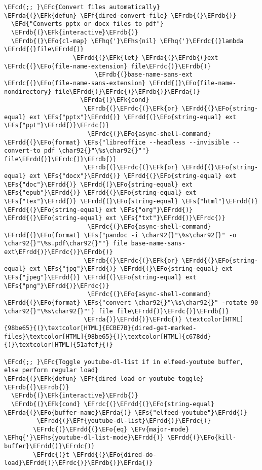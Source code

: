 \documentclass[a4wide,10pt]{article}
\newcommand{\EFc}[1]{\textcolor{EFc}{#1}} %
\newcommand{\EFcd}[1]{\textcolor{EFcd}{#1}} %
\newcommand{\EFs}[1]{\textcolor{EFs}{#1}} %
\newcommand{\EFd}[1]{\textcolor{EFd}{#1}} %
\newcommand{\EFk}[1]{\textcolor{EFk}{#1}} %
\newcommand{\EFf}[1]{\textcolor{EFf}{#1}} %
\newcommand{\EFv}[1]{\textcolor{EFv}{#1}} %
\newcommand{\EFo}[1]{\textcolor{EFo}{#1}} %
\newcommand{\EFhq}[1]{\textcolor{EFhq}{#1}} %
\newcommand{\EFhs}[1]{\textcolor{EFhs}{#1}} %
\newcommand{\EFrda}[1]{\textcolor{EFrda}{#1}} %
\newcommand{\EFrdb}[1]{\textcolor{EFrdb}{#1}} %
\newcommand{\EFrdc}[1]{\textcolor{EFrdc}{#1}} %
\newcommand{\EFrdd}[1]{\textcolor{EFrdd}{#1}} %
\begin{document}
\begin{Code}
\begin{Verbatim}
\EFcd{;; }\EFc{Convert files automatically}
\EFrda{(}\EFk{defun} \EFf{dired-convert-file} \EFrdb{(}\EFrdb{)}
  \EFd{"Converts pptx or docx files to pdf"}
  \EFrdb{(}\EFk{interactive}\EFrdb{)}
  \EFrdb{(}\EFo{cl-map} \EFhq{'}\EFhs{nil} \EFhq{'}\EFrdc{(}lambda \EFrdd{(}file\EFrdd{)}
                   \EFrdd{(}\EFk{let} \EFrda{(}\EFrdb{(}ext \EFrdc{(}\EFo{file-name-extension} file\EFrdc{)}\EFrdb{)}
                         \EFrdb{(}base-name-sans-ext \EFrdc{(}\EFo{file-name-sans-extension} \EFrdd{(}\EFo{file-name-nondirectory} file\EFrdd{)}\EFrdc{)}\EFrdb{)}\EFrda{)}
                     \EFrda{(}\EFk{cond}
                      \EFrdb{(}\EFrdc{(}\EFk{or} \EFrdd{(}\EFo{string-equal} ext \EFs{"pptx"}\EFrdd{)} \EFrdd{(}\EFo{string-equal} ext \EFs{"ppt"}\EFrdd{)}\EFrdc{)}
                       \EFrdc{(}\EFo{async-shell-command} \EFrdd{(}\EFo{format} \EFs{"libreoffice --headless --invisible --convert-to pdf \char92{}"\%s\char92{}""} file\EFrdd{)}\EFrdc{)}\EFrdb{)}
                      \EFrdb{(}\EFrdc{(}\EFk{or} \EFrdd{(}\EFo{string-equal} ext \EFs{"docx"}\EFrdd{)} \EFrdd{(}\EFo{string-equal} ext \EFs{"doc"}\EFrdd{)} \EFrdd{(}\EFo{string-equal} ext \EFs{"epub"}\EFrdd{)} \EFrdd{(}\EFo{string-equal} ext \EFs{"tex"}\EFrdd{)} \EFrdd{(}\EFo{string-equal} \EFs{"html"}\EFrdd{)} \EFrdd{(}\EFo{string-equal} ext \EFs{"org"}\EFrdd{)} \EFrdd{(}\EFo{string-equal} ext \EFs{"txt"}\EFrdd{)}\EFrdc{)}
                       \EFrdc{(}\EFo{async-shell-command} \EFrdd{(}\EFo{format} \EFs{"pandoc -i \char92{}"\%s\char92{}" -o \char92{}"\%s.pdf\char92{}""} file base-name-sans-ext\EFrdd{)}\EFrdc{)}\EFrdb{)}
                      \EFrdb{(}\EFrdc{(}\EFk{or} \EFrdd{(}\EFo{string-equal} ext \EFs{"jpg"}\EFrdd{)} \EFrdd{(}\EFo{string-equal} ext \EFs{"jpeg"}\EFrdd{)} \EFrdd{(}\EFo{string-equal} ext \EFs{"png"}\EFrdd{)}\EFrdc{)}
                       \EFrdc{(}\EFo{async-shell-command} \EFrdd{(}\EFo{format} \EFs{"convert \char92{}"\%s\char92{}" -rotate 90 \char92{}"\%s\char92{}""} file file\EFrdd{)}\EFrdc{)}\EFrdb{)}
                      \EFrda{)}\EFrdd{)}\EFrdc{)} \textcolor[HTML]{98be65}{(}\textcolor[HTML]{ECBE7B}{dired-get-marked-files}\textcolor[HTML]{98be65}{)}\textcolor[HTML]{c678dd}{)}\textcolor[HTML]{51afef}{)}

\EFcd{;; }\EFc{Toggle youtube-dl-list if in elfeed-youtube buffer, else perform regular load}
\EFrda{(}\EFk{defun} \EFf{dired-load-or-youtube-toggle} \EFrdb{(}\EFrdb{)}
  \EFrdb{(}\EFk{interactive}\EFrdb{)}
  \EFrdb{(}\EFk{cond} \EFrdc{(}\EFrdd{(}\EFo{string-equal} \EFrda{(}\EFo{buffer-name}\EFrda{)} \EFs{"elfeed-youtube"}\EFrdd{)}
         \EFrdd{(}\EFf{youtube-dl-list}\EFrdd{)}\EFrdc{)}
        \EFrdc{(}\EFrdd{(}\EFo{eq} \EFv{major-mode} \EFhq{'}\EFhs{youtube-dl-list-mode}\EFrdd{)} \EFrdd{(}\EFo{kill-buffer}\EFrdd{)}\EFrdc{)}
        \EFrdc{(}t \EFrdd{(}\EFo{dired-do-load}\EFrdd{)}\EFrdc{)}\EFrdb{)}\EFrda{)}


\end{Verbatim}
\end{Code}
\end{document}
